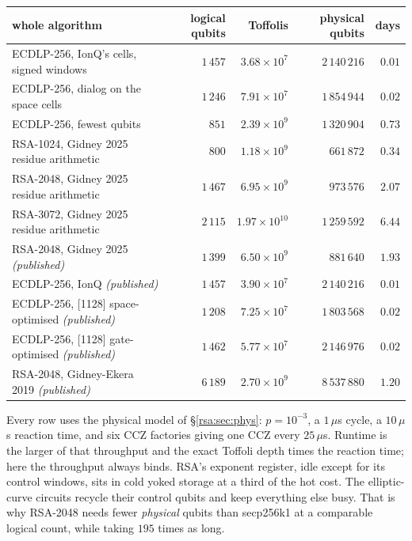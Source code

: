 \documentclass[11pt]{article}
\theoremstyle{plain}
\theoremstyle{remark}
\begin{document}
\begin{center}\small
\begin{tabular}{lrrrr}
\toprule
whole algorithm & logical qubits & Toffolis & physical qubits & days\\
\midrule
ECDLP-256, IonQ's cells, signed windows & $1\,457$ & $3.68\times10^{7}$ & $2\,140\,216$ & $0.01$\\
ECDLP-256, dialog on the space cells & $1\,246$ & $7.91\times10^{7}$ & $1\,854\,944$ & $0.02$\\
ECDLP-256, fewest qubits & $851$ & $2.39\times10^{9}$ & $1\,320\,904$ & $0.73$\\
RSA-1024, Gidney 2025 residue arithmetic & $800$ & $1.18\times10^{9}$ & $661\,872$ & $0.34$\\
RSA-2048, Gidney 2025 residue arithmetic & $1\,467$ & $6.95\times10^{9}$ & $973\,576$ & $2.07$\\
RSA-3072, Gidney 2025 residue arithmetic & $2\,115$ & $1.97\times10^{10}$ & $1\,259\,592$ & $6.44$\\
RSA-2048, Gidney 2025 \emph{(published)} & $1\,399$ & $6.50\times10^{9}$ & $881\,640$ & $1.93$\\
ECDLP-256, IonQ \emph{(published)} & $1\,457$ & $3.90\times10^{7}$ & $2\,140\,216$ & $0.01$\\
ECDLP-256, [1128] space-optimised \emph{(published)} & $1\,208$ & $7.25\times10^{7}$ & $1\,803\,568$ & $0.02$\\
ECDLP-256, [1128] gate-optimised \emph{(published)} & $1\,462$ & $5.77\times10^{7}$ & $2\,146\,976$ & $0.02$\\
RSA-2048, Gidney-Ekera 2019 \emph{(published)} & $6\,189$ & $2.70\times10^{9}$ & $8\,537\,880$ & $1.20$\\
\bottomrule
\end{tabular}
\end{center}

\noindent Every row uses the physical model of \S\ref{rsa:sec:phys}: $p=10^{-3}$, a $1\,\mu$s cycle, a $10\,\mu$s
reaction time, and six CCZ factories giving one CCZ every $25\,\mu$s. Runtime is the larger of
that throughput and the exact Toffoli depth times the reaction time; here the throughput always
binds. RSA's exponent register, idle except for its control windows, sits in cold yoked storage at
a third of the hot cost. The elliptic-curve circuits recycle their control qubits and keep
everything else busy. That is why RSA-2048 needs fewer \emph{physical} qubits than secp256k1 at a
comparable logical count, while taking $195$ times as long.
\end{document}
